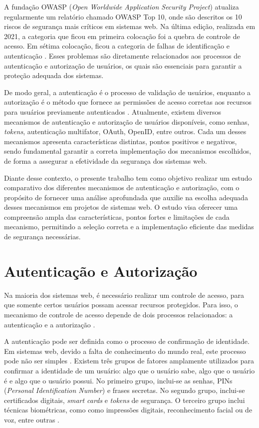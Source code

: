 \documentclass[12pt]{article}
\begin{document}
A fundação OWASP (\emph{Open Worldwide Application Security Project}) atualiza regularmente um
relatório chamado OWASP Top 10, onde são descritos os 10 riscos de segurança mais críticos em
sistemas web. Na última edição, realizada em 2021, a categoria que ficou em primeira colocação foi
a quebra de controle de acesso. Em sétima colocação, ficou a categoria de falhas de identificação e
autenticação \cite{OWASP2021}. Esses problemas são diretamente relacionados aos processos de
autenticação e autorização de usuários, os quais são essenciais para garantir a proteção adequada
dos sistemas.

De modo geral, a autenticação é o processo de validação de usuários, enquanto a autorização é o
método que fornece as permissões de acesso corretas aos recursos para usuários previamente
autenticados \cite{TUMIN2012}. Atualmente, existem diversos mecanismos de autenticação e autorização
de usuários disponíveis, como senhas, \emph{tokens}, autenticação multifator, OAuth, OpenID, entre
outros. Cada um desses mecanismos apresenta características distintas, pontos positivos e negativos,
sendo fundamental garantir a correta implementação dos mecanismos escolhidos, de forma a assegurar
a efetividade da segurança dos sistemas web.

Diante desse contexto, o presente trabalho tem como objetivo realizar um estudo
comparativo dos diferentes mecanismos de autenticação e autorização, com o propósito
de fornecer uma análise aprofundada que auxilie na escolha adequada desses mecanismos
em projetos de sistemas web. O estudo visa oferecer uma compreensão ampla das
características, pontos fortes e limitações de cada mecanismo, permitindo a seleção
correta e a implementação eficiente das medidas de segurança necessárias.

\section{Autenticação e Autorização}

Na maioria dos sistemas web, é necessário realizar um controle de acesso, para que somente
certos usuários possam acessar recursos protegidos. Para isso, o mecanismo  de controle de
acesso depende de dois processos relacionados: a autenticação e a autorização
\cite{SULLIVAN2011}.

A autenticação pode ser definida como o processo de confirmação de identidade. Em sistemas web,
devido a falta de conhecimento do mundo real, este processo pode não ser simples
\cite{CHAPMAN2012}. Existem três grupos de fatores amplamente utilizados para confirmar a
identidade de um usuário: algo que o usuário sabe, algo que o usuário é e algo que o usuário
possui. No primeiro grupo, inclui-se as senhas, PINs (\emph{Personal Identification Number}) e
frases secretas. No segundo grupo, inclui-se certificados digitais, \emph{smart cards} e
\emph{tokens} de segurança. O terceiro grupo inclui técnicas biométricas, como como impressões
digitais, reconhecimento facial ou de voz, entre outras \cite{SULLIVAN2011}.
\end{document}

